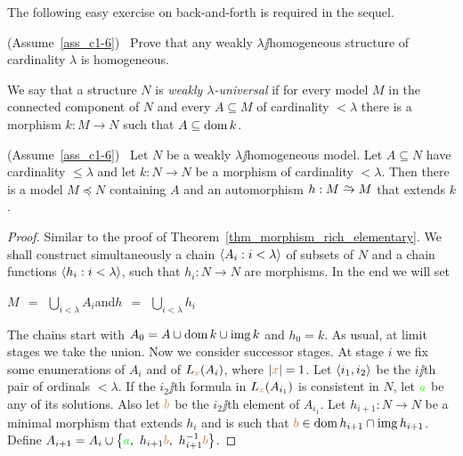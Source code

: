 \documentclass[creche.tex]{subfiles}
\begin{document}
The following easy exercise on back-and-forth is required in the sequel.

\begin{exercise}\label{omogeneo=debolmenteaomogeneo}
(Assume~\ref{ass_c1-6}) \ Prove that any weakly $\lambda\jj$ho\-mo\-ge\-ne\-ous structure of cardinality $\lambda$ is homogeneous.\QED
\end{exercise}

\begin{definition}\label{def_weakly_universal}
We say that a structure $N$ is \emph{weakly $\lambda$-universal\/} if for every model $M$ in the connected component of $N$ and every $A\subseteq M$ of cardinality $<\lambda$ there is a morphism $k:M\to N$ such that $A\subseteq\mathop{\rm dom} k$.\QED
\end{definition}

\begin{lemma}\label{debolmenteomogeneoandirivieni}
(Assume~\ref{ass_c1-6})  \  Let $N$ be a weakly $\lambda\jj$ho\-mo\-ge\-ne\-ous model.
Let $A\subseteq N$ have cardinality $\le\lambda$ and let $k:N\to N$ be a morphism of cardinality $<\lambda$.
Then there is a model  $M\preceq N$ containing $A$ and an automorphism $h:M\isomap M$ that extends $k$.
\end{lemma}

\begin{proof}
Similar to the proof of Theorem~\ref{thm_morphism_rich_elementary}.
We shall construct simultaneously a chain $\langle A_i:i<\lambda\rangle$ of subsets of $N$ and a chain functions $\langle h_i:i<\lambda\rangle$, such that $h_i:N\to N$ are morphisms.
In the end we will set

\hfil $\displaystyle M\ \ =\ \ \bigcup_{i<\lambda}A_i$\hfil  and\hfil  $\displaystyle h\ \ =\ \ \bigcup_{i<\lambda}h_i$ 

The chains start with $A_0=A\cup\mathop{\rm dom} k\cup\mathop{\rm img} k$ and $h_0=k$.
As usual, at limit stages we take the union.
Now we consider successor stages.
At stage $i$ we fix some enumerations of $A_i$ and of $L_{\color{brown} x}(A_i)$, where $|{\color{brown} x}|=1$.
Let $\langle i_1,i_2\rangle$ be the $i\jj$th pair of ordinals $<\lambda$.
If the $i_2\jj$th formula in $L_{\color{brown} x}(A_{i_1})$ is consistent in $N$, let ${\color{green} a}$ be any of its solutions.
Also let ${\color{brown} b}$ be the $i_2\jj$th element of $A_{i_1}$.
Let $h_{i+1}:N\to N$ be a minimal morphism that extends $h_i$ and is such that ${\color{brown} b}\in\mathop{\rm dom} h_{i+1}\cap\mathop{\rm img} h_{i+1}$.
Define $A_{i+1}=A_i\cup\big\{{\color{green} a},\ h_{i+1}{\color{brown} b},\  h_{i+1}^{-1}{\color{brown} b}\big\}$.
\end{proof}
\end{document}

